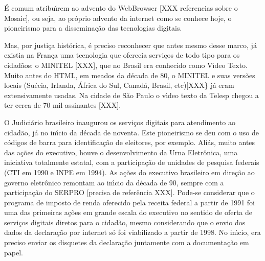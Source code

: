 \documentclass[
12pt,		%
openright,	%
twoside,  %
a4paper,			%
chapter=TITLE,		%
english,			%
french,				%
spanish,			%
brazil				%
]{USPSC-classe/USPSC}
\begin{document}
\'E comum atribu\'{\i}rem ao advento do WebBrowser [XXX referencias sobre o Mosaic], ou seja, ao pr\'oprio advento da internet como se conhece hoje, o pioneirismo para a dissemina\c{c}\~ao das tecnologias digitais.














Mas, por justi\c{c}a hist\'orica, \'e preciso reconhecer que antes mesmo desse marco, j\'a existia na Fran\c{c}a uma tecnologia que oferecia servi\c{c}os de todo tipo para os cidad\~aos: o MINITEL [XXX], que no Brasil era conhecido como V\'{\i}deo Texto. Muito antes do HTML, em meados da d\'ecada de 80, o MINITEL e suas vers\~oes locais (Su\'ecia, Irlanda, \'Africa do Sul, Canad\'a, Brasil, etc)[XXX\} j\'a eram extensivamente usadas. Na cidade de S\~ao Paulo o v\'{\i}deo texto da Telesp chegou a ter cerca de 70 mil assinantes [XXX].














O Judici\'ario brasileiro inaugurou os servi\c{c}os digitais para atendimento ao cidad\~ao, j\'a no in\'{\i}cio da d\'ecada de noventa. Este pioneirismo se deu com o uso de c\'odigos de barra para identifica\c{c}\~ao de eleitores, por exemplo. Ali\'as, muito antes das a\c{c}\~oes do executivo, houve o desenvolvimento da Urna Eletr\^onica, uma iniciativa totalmente estatal, com a participa\c{c}\~ao de unidades de pesquisa federais (CTI em 1990 e INPE em 1994). As a\c{c}\~oes do executivo brasileiro em dire\c{c}\~ao ao governo eletr\^onico remontam ao in\'{\i}cio da d\'ecada de 90, sempre com a participa\c{c}\~ao do SERPRO [precisa de refer\^encia XXX]. Pode-se considerar que o programa de imposto de renda oferecido pela receita federal a partir de 1991 foi uma das primeiras a\c{c}\~oes em grande escala do executivo no sentido de oferta de servi\c{c}os digitais diretos para o cidad\~ao, mesmo considerando que o envio dos dados da declara\c{c}\~ao por internet s\'o foi viabilizado a partir de 1998. No in\'{\i}cio, era preciso enviar os disquetes da declara\c{c}\~ao juntamente com a documenta\c{c}\~ao em papel.
\end{document}
